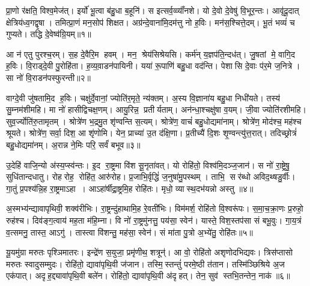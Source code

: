 
\clearpage
{}
\setcounter{anuvakam}{0}
प्रा॒णो र॑क्षति॒ विश्व॒मेज॑त्। इर्यो॑ भू॒त्वा ब॑हु॒धा ब॒हूनि॑। स इत्सर्व॒व्व्याँ॑नशे। यो दे॒वो दे॒वेषु॑ वि॒भूर॒न्तः। आवृ॑दू॒दात् क्षेत्रिय॑ध्व॒गद्वृषा। तमित्प्रा॒णं मन॒सोप॑ शिक्षत। अग्र॑न्दे॒वाना॑मि॒दम॑त्तु नो ह॒विः। मन॑स॒श्चित्ते॒दम्। भू॒तं भव्यं॑ च गुप्यते। तद्धि दे॒वेष्व॑ग्रि॒यम्॥१॥

आ न॑ एतु पुरश्च॒रम्। स॒ह दे॒वैरि॒म हवम्। मन॒ श्रेय॑सिश्रेयसि। कर्म॑न् य॒ज्ञप॑ति॒न्दध॑त्। जु॒षतां मे॒ वागि॒द ह॒विः। वि॒राड्दे॒वी पु॒रोहि॑ता। ह॒व्य॒वा़डन॑पायिनी। यया॑ रू॒पाणि॑ बहु॒धा वद॑न्ति। पेशासि दे॒वाः प॑र॒मे ज॒नित्रे। सा नो॑ वि॒राडन॑पस्फुरन्ती॥२॥

वाग्दे॒वी जु॑षतामि॒द ह॒विः। चक्षु॑र्दे॒वानां॒ ज्योति॑र॒मृते॒ न्य॑क्तम्। अ॒स्य वि॒ज्ञाना॑य बहु॒धा निधी॑यते। तस्य॑ सु॒म्नम॑शीमहि। मा नो॑ हासीद्विचक्ष॒णम्। आयु॒रिन्न॒ प्रतीर्यताम्। अन॑न्धा॒श्चक्षु॑षा व॒यम्। जी॒वा ज्योति॑रशीमहि। सुव॒र्ज्योति॑रु॒तामृतम्। श्रोत्रे॑ण भ॒द्रमु॒त शृ॑ण्वन्ति स॒त्यम्। श्रोत्रे॑ण॒ वाचं॑ बहु॒धोद्यमा॑नाम्। श्रोत्रे॑ण॒ मोद॑श्च॒ मह॑श्च श्रूयते। श्रोत्रे॑ण॒ सर्वा॒ दिश॒ आ शृ॑णोमि। येन॒ प्राच्या॑ उ॒त द॑क्षि॒णा। प्र॒तीच्यै॑ दि॒शः शृ॒ण्वन्त्यु॑त्त॒रात्। तदिच्छ्रोत्रं॑ बहु॒धोद्यमा॑नम्। अ॒रान्न ने॒मिः परि॒ सर्वं॑ बभूव॥३॥\anuvakamend[अ॒ग्रि॒यमन॑पस्फुरन्ती स॒त्य स॒प्त च॑]

उ॒देहि॑ वाजि॒न्यो अ॑स्य॒प्स्व॑न्तः। इ॒द रा॒ष्ट्रमा वि॑श सू॒नृता॑वत्। यो रोहि॑तो॒ विश्व॑मि॒दञ्ज॒जान॑। स नो॑ रा॒ष्ट्रेषु॒ सुधि॑तान्दधातु। रोहरोह॒ रोहि॑त॒ आरु॑रोह। प्र॒जाभि॒र्वृद्धिं॑ ज॒नुषा॑मु॒पस्थम्। ताभि॒ सर॑ब्धो अविद॒थ्षडु॒र्वीः। गा॒तुं प्र॒पश्य॑न्नि॒ह रा॒ष्ट्रमाऽहा। आऽहा॑र्\mbox{}षीद्रा॒ष्ट्रमि॒ह रोहि॑तः। मृधो॒ व्यास्थ॒दभ॑यन्नो अस्तु ॥४॥

अ॒स्मभ्य॑न्द्यावापृथिवी॒ शक्व॑रीभिः। रा॒ष्ट्रन्दु॑हाथामि॒ह रे॒वती॑भिः। विम॑मर्\mbox{}श॒ रोहि॑तो वि॒श्वरू॑पः। स॒मा॒च॒क्रा॒णः प्र॒रुहो॒ रुह॑श्च। दिव॑ङ्ग॒त्वाय॑ मह॒ता म॑हि॒म्ना। वि नो॑ रा॒ष्ट्रमु॑नत्तु॒ पय॑सा॒ स्वेन॑। यास्ते॒ विश॒स्तप॑सा सं बभू॒वुः। गा॒य॒त्रं व॒त्समनु॒ तास्त॒ आऽगु॑। तास्त्वा वि॑शन्तु॒ मह॑सा॒ स्वेन॑। सं मा॑ता पु॒त्रो अ॒भ्ये॑तु॒ रोहि॑तः॥५॥

यू॒यमु॑ग्रा मरुतः पृश्ञिमातरः। इन्द्रे॑ण स॒युजा॒ प्रमृ॑णीथ॒ शत्रून्॑। आ वो॒ रोहि॑तो अशृणोदभिद्यवः। त्रिस॑प्तासो मरुतः स्वादुसम्मुदः। रोहि॑तो॒ द्यावा॑पृथि॒वी ज॑जान। तस्मि॒स्तन्तुं॑ परमे॒ष्ठी त॑तान। तस्मि॑ञ्छिश्रिये अ॒ज एक॑पात्। अदृह॒द्द्यावा॑पृथि॒वी बले॑न। रोहि॑तो॒ द्यावा॑पृथि॒वी अ॑दृहत्। तेन॒ सुव॑ स्तभि॒तन्तेन॒ नाक॑॥६॥

